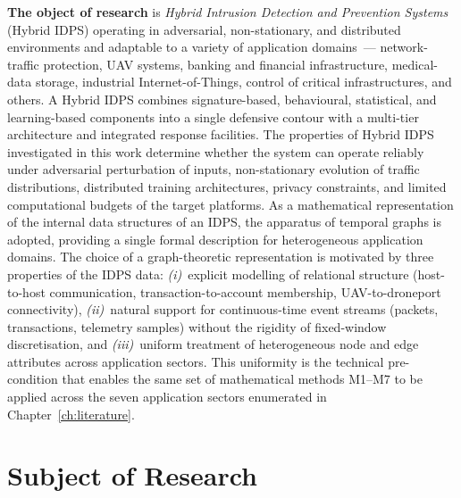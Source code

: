 \textbf{The object of research} is \emph{Hybrid Intrusion Detection and Prevention Systems} (Hybrid IDPS) operating in adversarial, non-stationary, and distributed environments and adaptable to a variety of application domains~--- network-traffic protection, UAV systems, banking and financial infrastructure, medical-data storage, industrial Internet-of-Things, control of critical infrastructures, and others. A Hybrid IDPS combines signature-based, behavioural, statistical, and learning-based components into a single defensive contour with a multi-tier architecture and integrated response facilities. The properties of Hybrid IDPS investigated in this work determine whether the system can operate reliably under adversarial perturbation of inputs, non-stationary evolution of traffic distributions, distributed training architectures, privacy constraints, and limited computational budgets of the target platforms. As a mathematical representation of the internal data structures of an IDPS, the apparatus of temporal graphs is adopted, providing a single formal description for heterogeneous application domains. The choice of a graph-theoretic representation is motivated by three properties of the IDPS data: \emph{(i)}~explicit modelling of relational structure (host-to-host communication, transaction-to-account membership, UAV-to-droneport connectivity), \emph{(ii)}~natural support for continuous-time event streams (packets, transactions, telemetry samples) without the rigidity of fixed-window discretisation, and \emph{(iii)}~uniform treatment of heterogeneous node and edge attributes across application sectors. This uniformity is the technical pre-condition that enables the same set of mathematical methods M1--M7 to be applied across the seven application sectors enumerated in Chapter~\ref{ch:literature}.

\section*{Subject of Research}

